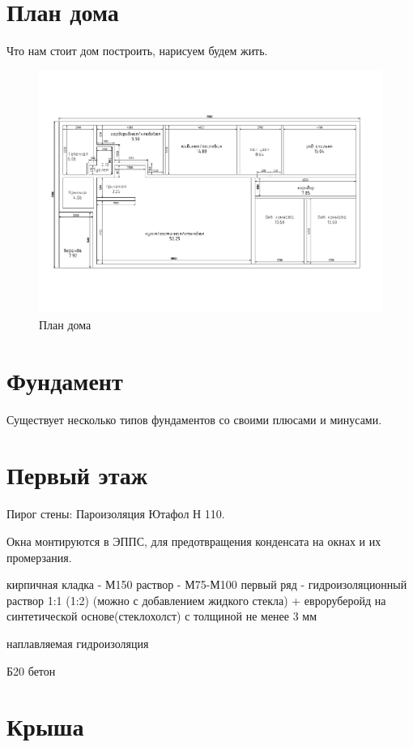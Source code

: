 \documentclass[10pt, twocolumn]{report}
\begin{document}
\chapter{План дома}
Что нам стоит дом построить, нарисуем будем жить.

\begin{figure}[h]
	\centering
	\includegraphics[width=1.0\textwidth]{img/plan.pdf}
	\caption{План дома}
	\label{fig:plan}
\end{figure}

\chapter{Фундамент}

Существует несколько типов фундаментов со своими плюсами и минусами.

\chapter{Первый этаж}

Пирог стены:
Пароизоляция Ютафол Н 110.

Окна монтируются в ЭППС, для предотвращения конденсата на окнах и их промерзания.

кирпичная кладка - М150
раствор - М75-М100
первый ряд - гидроизоляционный раствор 1:1 (1:2) (можно с добавлением жидкого стекла) + евроруберойд на синтетической основе(стеклохолст) с толщиной не менее 3 мм

наплавляемая гидроизоляция

Б20 бетон

\chapter{Крыша}
\end{document}
